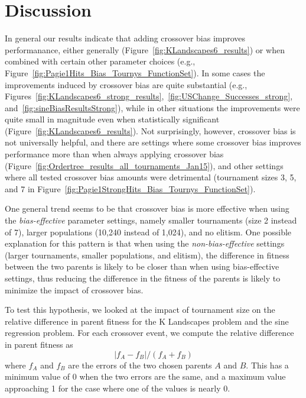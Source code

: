 \documentclass{sig-alternate}
\begin{document}
\section{Discussion} \label{sec:Discussion}

In general our results indicate that adding crossover bias improves performanance, either generally
(Figure~\ref{fig:KLandscapes6_results}) or when combined with certain other parameter choices (e.g.,
Figure~\ref{fig:Pagie1Hits_Bias_Tournys_FunctionSet}). In some cases the improvements induced by crossover bias are
quite substantial (e.g., Figures~\ref{fig:KLandscapes6_strong_results},~\ref{fig:USChange_Successes_strong},
and~\ref{fig:sineBiasResultsStrong}), while in other situations the improvements were quite small in magnitude even
when statistically significant (Figure~\ref{fig:KLandscapes6_results}). Not surprisingly, however, crossover bias is
not universally helpful, and there are settings where some crossover bias improves performance more than when always
applying crossover bias (Figure~\ref{fig:Ordertree_results_all_tournaments_Jan15}), and other settings where all tested
crossover bias amounts were detrimental (tournament sizes 3, 5, and 7 in
Figure~\ref{fig:Pagie1StrongHits_Bias_Tournys_FunctionSet}).

One general trend seems to be that crossover bias is more effective when using the \emph{bias-effective} parameter
settings, namely smaller tournaments (size 2 instead of 7), larger populations (10,240 instead of 1,024), and no
elitism. One possible explanation for this pattern is that when using the \emph{non-bias-effective} settings (larger
tournaments, smaller populations, and elitism), the difference in fitness between the two parents is likely to be
closer than when using bias-effective settings, thus reducing the difference in the fitness of the parents is likely to
minimize the impact of crossover bias.


To test this hypothesis, we looked at the impact of tournament size on the relative difference in parent fitness for
the K Landscapes problem and the sine regression problem. For each crossover event, we compute the relative difference
in parent fitness as
\[
	|f_A - f_B| / (f_A + f_B)
\]
where $f_A$ and $f_B$ are the errors of the two chosen parents $A$ and $B$. This has a minimum value of 0 when the two
errors are the same, and a maximum value approaching 1 for the case where one of the values is nearly 0.
\end{document}
